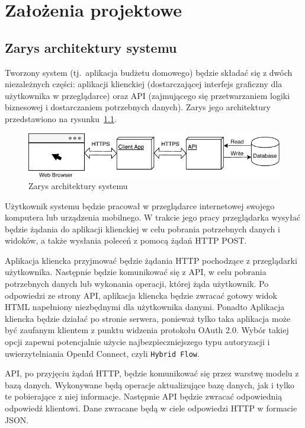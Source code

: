 \chapter{Założenia projektowe}
\label{chap:zalozenia-projektowe}
\section{Zarys architektury systemu}
\label{sec:zarys-arch}
Tworzony system (tj.\ aplikacja budżetu domowego) będzie składać się z dwóch niezależnych części: aplikacji klienckiej (dostarczającej interfejs graficzny dla użytkownika w przeglądarce) oraz API (zajmującego się przetwarzaniem logiki biznesowej i dostarczaniem potrzebnych danych). Zarys jego architektury przedstawiono na rysunku~\ref{fig:ogolna-arch}.
\begin{figure}[h]
	\centering
	\includegraphics[width=.9\linewidth]{rys03/ogolna-arch.pdf}
	\caption{Zarys architektury systemu}
	\label{fig:ogolna-arch}
\end{figure}

Użytkownik systemu będzie pracował w przeglądarce internetowej swojego komputera lub urządzenia mobilnego. W trakcie jego pracy przeglądarka wysyłać będzie żądania do aplikacji klienckiej w celu pobrania potrzebnych danych i widoków, a także wysłania poleceń z pomocą żądań HTTP POST.

Aplikacja kliencka przyjmować będzie żądania HTTP pochodzące z przeglądarki użytkownika. Następnie będzie komunikować się z API, w celu pobrania potrzebnych danych lub wykonania operacji, której żąda użytkownik. Po odpowiedzi ze strony API, aplikacja kliencka będzie zwracać gotowy widok HTML napełniony niezbędnymi dla użytkownika danymi. Ponadto Aplikacja kliencka będzie działać po stronie serwera, ponieważ tylko taka aplikacja może być zaufanym klientem z punktu widzenia protokołu OAuth 2.0. Wybór takiej opcji zapewni potencjalnie użycie najbezpieczniejszego typu autoryzacji i uwierzytelniania OpenId Connect, czyli \texttt{Hybrid Flow}. 

API, po przyjęciu żądań HTTP, będzie komunikować się przez warstwę modelu z bazą danych. Wykonywane będą operacje aktualizujące bazę danych, jak i tylko te pobierające z niej informacje. Następnie API będzie zwracać odpowiednią odpowiedź klientowi. Dane zwracane będą w ciele odpowiedzi HTTP w formacie JSON.


